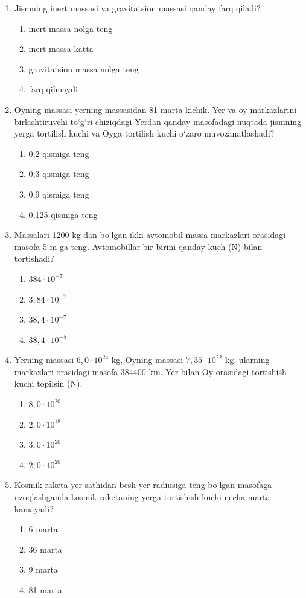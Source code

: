 \begin{enumerate}
\item Jismning inert massasi va gravitatsion massasi qanday farq qiladi?
\begin{enumerate}[label=\Alph*)]
\item inert massa nolga teng
\item inert massa katta
\item gravitatsion massa nolga teng
\item farq qilmaydi
\end{enumerate}

\item Oyning massasi yerning massasidan 81 marta kichik. Yer va oy markazlarini birlashtiruvchi to‘g‘ri chiziqdagi Yerdan qanday masofadagi nuqtada jismning yerga tortilish kuchi va Oyga tortilish kuchi o‘zaro muvozanatlashadi?
\begin{enumerate}[label=\Alph*)]
\item 0,2 qismiga teng
\item 0,3 qismiga teng
\item 0,9 qismiga teng
\item 0,125 qismiga teng
\end{enumerate}

\item Massalari 1200 kg dan bo‘lgan ikki avtomobil massa markazlari orasidagi masofa 5 m ga teng. Avtomobillar bir-birini qanday kuch (N) bilan tortishadi?
\begin{enumerate}[label=\Alph*)]
\item $384 \cdot 10^{-7}$
\item $3,84 \cdot 10^{-7}$
\item $38,4 \cdot 10^{-7}$
\item $38,4 \cdot 10^{-5}$
\end{enumerate}

\item Yerning massasi $6,0 \cdot 10^{24}$ kg, Oyning massasi $7,35 \cdot 10^{22}$ kg, ularning markazlari orasidagi masofa 384400 km. Yer bilan Oy orasidagi tortishish kuchi topilsin (N).
\begin{enumerate}[label=\Alph*)]
\item $8,0 \cdot 10^{20}$
\item $2,0 \cdot 10^{18}$
\item $3,0 \cdot 10^{20}$
\item $2,0 \cdot 10^{20}$
\end{enumerate}

\item Kosmik raketa yer sathidan besh yer radiusiga teng bo‘lgan masofaga uzoqlashganda kosmik raketaning yerga tortishish kuchi necha marta kamayadi?
\begin{enumerate}[label=\Alph*)]
\item 6 marta
\item 36 marta
\item 9 marta
\item 81 marta
\end{enumerate}


\end{enumerate}
